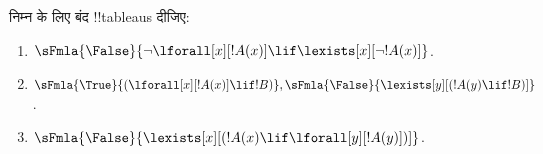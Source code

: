 \documentclass[../../../include/open-logic-section]{subfiles}
\begin{document}
\begin{prob}
निम्न के लिए बंद !!{tableau}s दीजिए:
\begin{enumerate}
\item $\sFmla{\False}{\lnot\lforall[x][!A(x)] \lif \lexists[x][\lnot!A(x)]}$.
\item $\sFmla{\True}{(\lforall[x][!A(x)] \lif !B)}, \sFmla{\False}{\lexists[y][(!A(y) \lif !B)]}$.
\item $\sFmla{\False}{\lexists[x][(!A(x) \lif \lforall[y][!A(y)])]}$.
\end{enumerate}
\end{prob}
\end{document}
